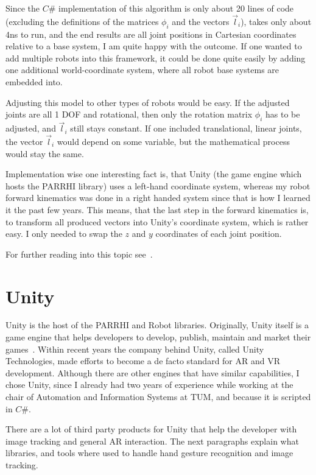 \FloatBarrier

Since the $C\#$ implementation of this algorithm is only about 20 lines of code (excluding the definitions of the matrices $\phi_i$ and the vectors $\vec{l}_i$), takes only about 4ns to run, and the end results are all joint positions in Cartesian coordinates relative to a base system, I am quite happy with the outcome. If one wanted to add multiple robots into this framework, it could be done quite easily by adding one additional world-coordinate system, where all robot base systems are embedded into.
	
Adjusting this model to other types of robots would be easy. If the adjusted joints are all 1 DOF and rotational, then only the rotation matrix $\phi_i$ has to be adjusted, and $\vec{l}_i$ still stays constant. If one included translational, linear joints, the vector $\vec{l}_i$ would depend on some variable, but the mathematical process would stay the same.

Implementation wise one interesting fact is, that Unity (the game engine which hosts the PARRHI library) uses a left-hand coordinate system, whereas my robot forward kinematics was done in a right handed system since that is how I learned it the past few years. This means, that the last step in the forward kinematics is, to transform all produced vectors into Unity's coordinate system, which is rather easy. I only needed to swap the $z$ and $y$ coordinates of each joint position.

For further reading into this topic see~\cite{murray2017mathematical}.
	
\section{Unity}
Unity is the host of the PARRHI and Robot libraries. Originally, Unity itself is a game engine that helps developers to develop, publish, maintain and market their games~\cite{Unity}. Within recent years the company behind Unity, called Unity Technologies, made efforts to become a de facto standard for AR and VR development. Although there are other engines that have similar capabilities, I chose Unity, since I already had two years of experience while working at the chair of Automation and Information Systems at TUM, and because it is scripted in $C\#$. 

There are a lot of third party products for Unity that help the developer with image tracking and general AR interaction. The next paragraphs explain what libraries, and tools where used to handle hand gesture recognition and image tracking.

